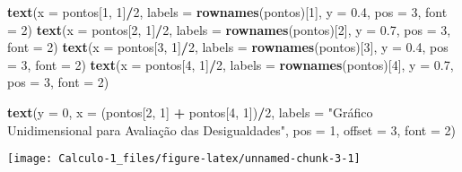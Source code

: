 \documentclass[]{book}
\newenvironment{Shaded}{\begin{snugshade}}{\end{snugshade}}
\newcommand{\KeywordTok}[1]{\textcolor[rgb]{0.13,0.29,0.53}{\textbf{#1}}}
\newcommand{\DataTypeTok}[1]{\textcolor[rgb]{0.13,0.29,0.53}{#1}}
\newcommand{\DecValTok}[1]{\textcolor[rgb]{0.00,0.00,0.81}{#1}}
\newcommand{\FloatTok}[1]{\textcolor[rgb]{0.00,0.00,0.81}{#1}}
\newcommand{\StringTok}[1]{\textcolor[rgb]{0.31,0.60,0.02}{#1}}
\newcommand{\OperatorTok}[1]{\textcolor[rgb]{0.81,0.36,0.00}{\textbf{#1}}}
\newcommand{\NormalTok}[1]{#1}
\begin{document}
\begin{Shaded}
\begin{Highlighting}[]
\KeywordTok{text}\NormalTok{(}\DataTypeTok{x =}\NormalTok{ pontos[}\DecValTok{1}\NormalTok{, }\DecValTok{1}\NormalTok{]}\OperatorTok{/}\DecValTok{2}\NormalTok{, }\DataTypeTok{labels =} \KeywordTok{rownames}\NormalTok{(pontos)[}\DecValTok{1}\NormalTok{], }\DataTypeTok{y =} \FloatTok{0.4}\NormalTok{,}
     \DataTypeTok{pos =} \DecValTok{3}\NormalTok{, }\DataTypeTok{font =} \DecValTok{2}\NormalTok{)}
\KeywordTok{text}\NormalTok{(}\DataTypeTok{x =}\NormalTok{ pontos[}\DecValTok{2}\NormalTok{, }\DecValTok{1}\NormalTok{]}\OperatorTok{/}\DecValTok{2}\NormalTok{, }\DataTypeTok{labels =} \KeywordTok{rownames}\NormalTok{(pontos)[}\DecValTok{2}\NormalTok{], }\DataTypeTok{y =} \FloatTok{0.7}\NormalTok{,}
     \DataTypeTok{pos =} \DecValTok{3}\NormalTok{, }\DataTypeTok{font =} \DecValTok{2}\NormalTok{)}
\KeywordTok{text}\NormalTok{(}\DataTypeTok{x =}\NormalTok{ pontos[}\DecValTok{3}\NormalTok{, }\DecValTok{1}\NormalTok{]}\OperatorTok{/}\DecValTok{2}\NormalTok{, }\DataTypeTok{labels =} \KeywordTok{rownames}\NormalTok{(pontos)[}\DecValTok{3}\NormalTok{], }\DataTypeTok{y =} \FloatTok{0.4}\NormalTok{,}
     \DataTypeTok{pos =} \DecValTok{3}\NormalTok{, }\DataTypeTok{font =} \DecValTok{2}\NormalTok{)}
\KeywordTok{text}\NormalTok{(}\DataTypeTok{x =}\NormalTok{ pontos[}\DecValTok{4}\NormalTok{, }\DecValTok{1}\NormalTok{]}\OperatorTok{/}\DecValTok{2}\NormalTok{, }\DataTypeTok{labels =} \KeywordTok{rownames}\NormalTok{(pontos)[}\DecValTok{4}\NormalTok{], }\DataTypeTok{y =} \FloatTok{0.7}\NormalTok{,}
     \DataTypeTok{pos =} \DecValTok{3}\NormalTok{, }\DataTypeTok{font =} \DecValTok{2}\NormalTok{)}

\KeywordTok{text}\NormalTok{(}\DataTypeTok{y =} \DecValTok{0}\NormalTok{, }\DataTypeTok{x =}\NormalTok{ (pontos[}\DecValTok{2}\NormalTok{, }\DecValTok{1}\NormalTok{] }\OperatorTok{+}\StringTok{ }\NormalTok{pontos[}\DecValTok{4}\NormalTok{, }\DecValTok{1}\NormalTok{])}\OperatorTok{/}\DecValTok{2}\NormalTok{,}
     \DataTypeTok{labels =} \StringTok{"Gráfico Unidimensional para Avaliação das Desigualdades"}\NormalTok{,}
     \DataTypeTok{pos =} \DecValTok{1}\NormalTok{, }\DataTypeTok{offset =} \DecValTok{3}\NormalTok{, }\DataTypeTok{font =} \DecValTok{2}\NormalTok{)}
\end{Highlighting}
\end{Shaded}

\begin{center}\texttt{[image: Calculo-1\_files/figure-latex/unnamed-chunk-3-1]} \end{center}

~
\end{document}
